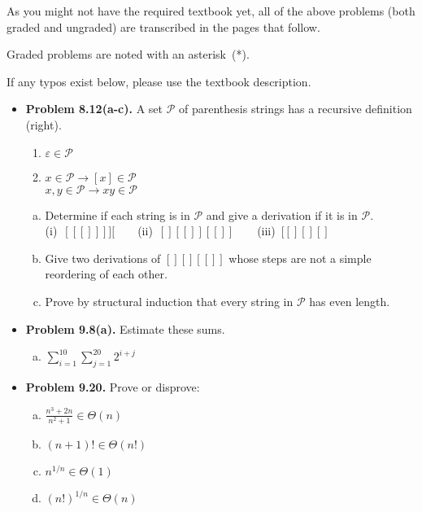 \documentclass[11pt]{article}
\def\imp{\rightarrow}
\begin{document}
As you might not have the required textbook yet,
all of the above problems (both graded and ungraded)
are transcribed in the pages that follow.

Graded problems are noted with an asterisk~(*).

If any typos exist below, please use the textbook description.

\newpage
\begin{itemize}

\item \textbf{Problem 8.12(a-c).}
A set $\mathcal{P}$ of parenthesis strings has a recursive definition (right).
\begin{enumerate}[(1)]
\item $\varepsilon\in\mathcal{P}$
\item $x\in\mathcal{P}\imp [x]\in\mathcal{P}$ \\
  $x,y\in\mathcal{P}\imp xy\in\mathcal{P}$
\end{enumerate}
\begin{enumerate}[(a)]
\item Determine if each string is in $\mathcal{P}$ and
  give a derivation if it is in $\mathcal{P}$. \\
  (i)~$[[[]]]][$\ \ \ \ (ii)~$[][[]][[]]$\ \ \ \ (iii)~$[[][][]$
\item Give two derivations of $[][][[]]$ whose steps are not a simple reordering of each other.
\item Prove by structural induction that every string in $\mathcal{P}$ has even length.
\end{enumerate}

\vspace{0.1in}

\item \textbf{Problem 9.8(a).}
Estimate these sums.
\begin{enumerate}[(a)]
\item $\displaystyle \sum_{i=1}^{10} \sum_{j=1}^{20} 2^{i+j}$
\end{enumerate}

\vspace{0.1in}

\item \textbf{Problem 9.20.}
Prove or disprove:
\begin{enumerate}[(a)]
\item $\displaystyle\frac{n^3+2n}{n^2+1}\in\Theta(n)$
\item $(n+1)!\in\Theta(n!)$
\item $n^{1/n}\in\Theta(1)$
\item $(n!)^{1/n}\in\Theta(n)$
\end{enumerate}


\end{itemize}
\end{document}
